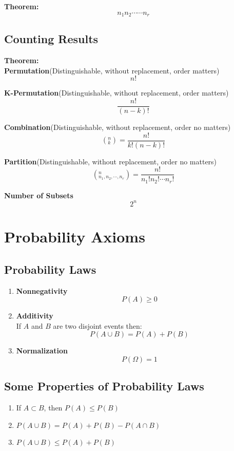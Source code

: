 \documentclass[11pt]{article}
\begin{document}
\textbf{Theorem:}
$$n_1 n_2 \cdots \cdots n_r$$

\subsection{Counting Results}
\textbf{Theorem:}\\
\indent \textbf{Permutation}(Distinguishable, without replacement, order matters)
$$n!$$

\indent \textbf{K-Permutation}(Distinguishable, without replacement, order matters)
$$\frac{n!}{(n-k)!}$$

\indent \textbf{Combination}(Distinguishable, without replacement, order no matters)
$$\left(^{n} _{k}\right) = \frac{n!}{k!(n-k)!}$$

\indent \textbf{Partition}(Distinguishable, without replacement, order no matters)
$$\left(^n _{n_1,n_2,\cdots,n_r}\right) = \frac{n!}{n_{1}! n_{2}! \cdots n_{r}!}$$

\indent \textbf{Number of Subsets}
$$2^n$$

\section{Probability Axioms}
\subsection{Probability Laws}
\begin{enumerate}
    \item \textbf{Nonnegativity}
    $$P(A) \geq 0$$
    \item \textbf{Additivity}\\
    If $A$ and $B$ are two disjoint events then:
    $$P(A \cup B) = P(A) + P(B)$$
    \item \textbf{Normalization}
    $$P(\Omega) = 1$$
\end{enumerate}

\subsection{Some Properties of Probability Laws}
\begin{enumerate}
    \item If $A \subset B$, then $P(A) \leq P(B)$
    \item $P(A \cup B) = P(A) + P(B) - P(A \cap B)$
    \item $P(A \cup B) \leq P(A) + P(B)$
\end{enumerate}
\end{document}
